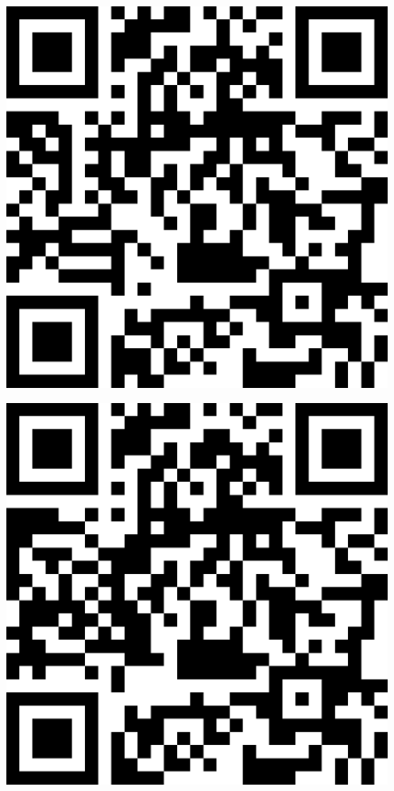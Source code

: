 \documentclass[letterpaper]{article}
\begin{document}
 \endgroup 
 \vspace*{\fill} 
 \pagebreak 
{} 
 \vspace*{\fill} 
 \begingroup 
 \centerline{\includegraphics[scale=1,width=5in,height=5in]{ICL1.png}} 
 \endgroup 
 \vspace*{\fill} 
 \pagebreak 
{} 
 \vspace*{\fill} 
 \begingroup 
 \centerline{\includegraphics[scale=1,width=5in,height=5in]{ICL2.png}} 
\end{document}
